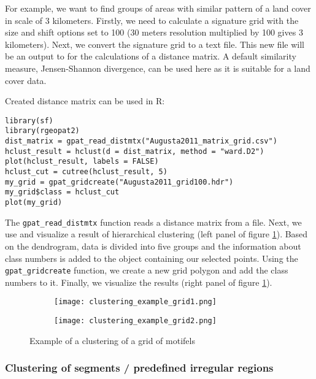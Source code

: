 For example, we want to find groups of areas with similar pattern of a land cover in scale of 3 kilometers.
Firstly, we need to calculate a signature grid with the size and shift options set to 100 (30 meters resolution multiplied by 100 gives 3 kilometers).
Next, we convert the signature grid to a text file.
This new file will be an output to for the calculations of a distance matrix.
A default similarity measure, Jensen-Shannon divergence, can be used here as it is suitable for a land cover data.

Created distance matrix can be used in R:

\begin{minipage}{\linewidth}
\begin{lstlisting}
library(sf)
library(rgeopat2)
dist_matrix = gpat_read_distmtx("Augusta2011_matrix_grid.csv")
hclust_result = hclust(d = dist_matrix, method = "ward.D2")
plot(hclust_result, labels = FALSE)
hclust_cut = cutree(hclust_result, 5)
my_grid = gpat_gridcreate("Augusta2011_grid100.hdr")
my_grid$class = hclust_cut
plot(my_grid)
\end{lstlisting}
\end{minipage}

The {\tt gpat\_read\_distmtx} function reads a distance matrix from a file. 
Next, we use and visualize a result of hierarchical clustering (left panel of figure \ref{FIG:CLUSTER_GRID2}).
Based on the dendrogram, data is divided into five groups and the information about class numbers is added to the object containing our selected points.
Using the {\tt gpat\_gridcreate} function, we create a new grid polygon and add the class numbers to it.
Finally, we visualize the results (right panel of figure \ref{FIG:CLUSTER_GRID2}).

\begin{figure}[H]
  \begin{subfigure}[b]{0.5\textwidth}
    \texttt{[image: clustering\_example\_grid1.png]}
  \end{subfigure}
  \begin{subfigure}[b]{0.5\textwidth}
    \texttt{[image: clustering\_example\_grid2.png]}
  \end{subfigure}
  \caption{Example of a clustering of a grid of motifels}
  \label{FIG:CLUSTER_GRID2}
\end{figure}

\FloatBarrier

\subsubsection{Clustering of segments / predefined irregular regions}

